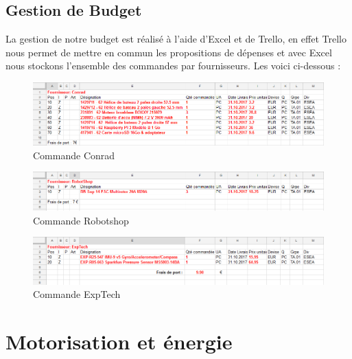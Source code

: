\documentclass[a4paper,11pt]{report}
\begin{document}
				\section{Gestion de Budget}
				La gestion de notre budget est réalisé à l'aide d'Excel et de Trello, en effet Trello nous permet de mettre en commun les propositions de dépenses et avec Excel nous stockons l'ensemble des commandes par fournisseurs. \newline \newline Les voici ci-dessous :
					\begin{figure}[!h]
							\begin{center}
								\includegraphics[scale=0.5]{Illustrations/Conrad.png}
								\caption{Commande Conrad}
							\end{center}
					\end{figure}
					\begin{figure}[!h]
							\begin{center}
								\includegraphics[scale=0.5]{Illustrations/Robotshop.png}
								\caption{Commande Robotshop}
							\end{center}
					\end{figure}
					\begin{figure}[!h]
							\begin{center}
								\includegraphics[scale=0.5]{Illustrations/Exptech.png}
								\caption{Commande ExpTech}
							\end{center}
					\end{figure}
								
\chapter{Motorisation et énergie}
\end{document}
